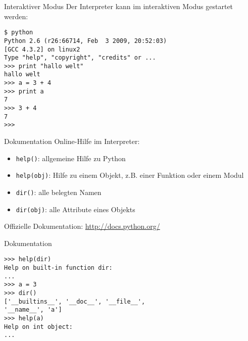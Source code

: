 \begin{frame}[fragile]{Interaktiver Modus}
Der Interpreter kann im interaktiven Modus gestartet werden:
\begin{lstlisting}[style=Shell]
$ python
Python 2.6 (r26:66714, Feb  3 2009, 20:52:03) 
[GCC 4.3.2] on linux2
Type "help", "copyright", "credits" or ...
>>> print "hallo welt"
hallo welt
>>> a = 3 + 4
>>> print a
7
>>> 3 + 4
7
>>>
\end{lstlisting} %
\end{frame}

\begin{frame}{Dokumentation}
Online-Hilfe im Interpreter:
\begin{itemize}
\item \alert{\lstinline{help()}}: allgemeine Hilfe zu Python
\item \alert{\lstinline{help(obj)}}: Hilfe zu einem Objekt, z.B. einer Funktion oder einem Modul
\item \alert{\lstinline{dir()}}: alle belegten Namen 
\item \alert{\lstinline{dir(obj)}}: alle Attribute eines Objekts
\end{itemize}
\vspace{5mm}
Offizielle Dokumentation: \href{http://docs.python.org/}{http://docs.python.org/}
\end{frame}

\begin{frame}[fragile]{Dokumentation}
\begin{lstlisting}[style=Shell]
>>> help(dir)
Help on built-in function dir:
...
>>> a = 3
>>> dir()
['__builtins__', '__doc__', '__file__', 
'__name__', 'a']
>>> help(a)
Help on int object:
...
\end{lstlisting}
\end{frame}

